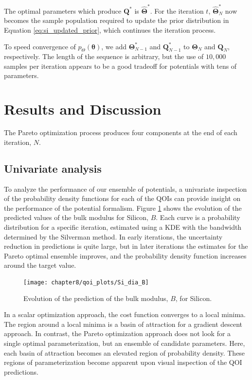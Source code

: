 The optimal parameters which produce $\bm{Q}^*$ is $\hat{\bm{\Theta}}^*$.  For the iteration $t$, $\hat{\bm{\Theta}}_{N}^*$ now becomes the sample population required to update the prior distribution in Equation \ref{eq:si_updated_prior}, which continues the iteration process.

To speed convergence of $p_{\Theta}(\bm{\theta})$, we add $\bm{\Theta}_{N-1}^*$ and $\bm{Q}_{N-1}^*$ to $\bm{\Theta}_{N}$ and $\bm{Q}_{N}$, respectively.  The length of the sequence is arbitrary, but the use of $10,000$ samples per iteration appears to be a good tradeoff for potentials with tens of parameters.

\section{Results and Discussion}

The Pareto optimization process produces four components at the end of each iteration, $N$.

\subsection{Univariate analysis}
To analyze the performance of our ensemble of potentials, a univariate inspection of the probability density functions for each of the QOIs can provide insight on the performance of the potential formalism.
Figure \ref{fig:Si_qoi_B} shows the evolution of the predicted values of the bulk modulus for Silicon, $B$.  Each curve is a probability distribution for a specific iteration, estimated using a KDE with the bandwidth determined by the Silverman method\cite{silverman1986_kde}.
In early iterations, the uncertainty reduction in predictions is quite large, but in later iterations the estimates for the Pareto optimal ensemble improves, and the probability density function increases around the target value.

\begin{figure}[h]
	\centering
	\texttt{[image: chapter8/qoi\_plots/Si\_dia\_B]}
	\caption{Evolution of the prediction of the bulk modulus, $B$, for Silicon.}
	\label{fig:Si_qoi_B}
\end{figure}

In a scalar optimization approach, the cost function converges to a local minima.  The region around a local minima is a basin of attraction for a gradient descent approach.  In contrast, the Pareto optimization approach does not look for a single optimal parameterization, but an ensemble of candidate parameters.  Here, each basin of attraction becomes an elevated region of probability density.  These regions of parameterization become apparent upon visual inspection of the QOI predictions.

